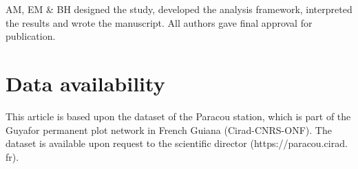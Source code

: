 \documentclass[fleqn,10pt]{ArtEcoFoG} %
\begin{document}
AM, EM \& BH designed the study, developed the analysis framework,
interpreted the results and wrote the manuscript. All authors gave final
approval for publication.

\section{Data availability}\label{data-availability}

This article is based upon the dataset of the Paracou station, which is
part of the Guyafor permanent plot network in French Guiana
(Cirad-CNRS-ONF). The dataset is available upon request to the
scientific director (https://paracou.cirad. fr).



\makeatletter

\makeatother


\end{document}
